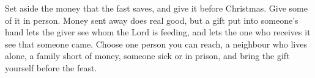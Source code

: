 Set aside the money that the fast saves, and give it before Christmas. Give
some of it in person. Money sent away does real good, but a gift put into
someone's hand lets the giver see whom the Lord is feeding, and lets the one who
receives it see that someone came. Choose one person you can reach, a neighbour
who lives alone, a family short of money, someone sick or in prison, and bring
the gift yourself before the feast.
